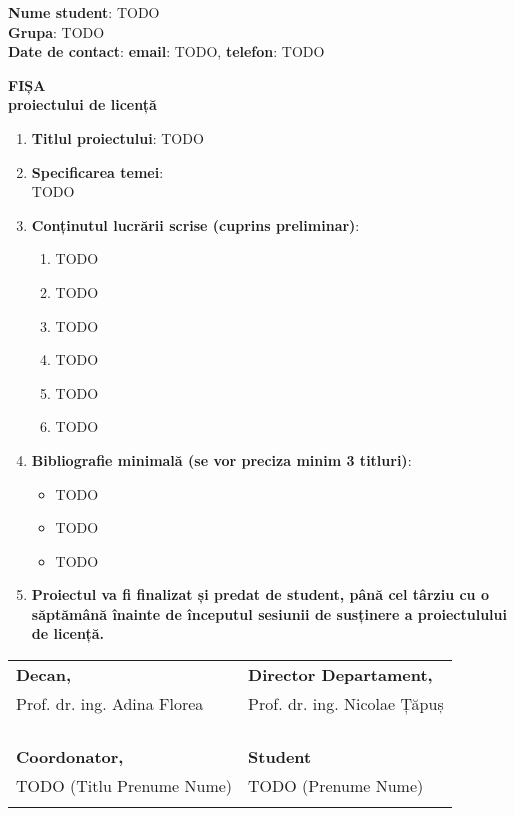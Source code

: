 \documentclass[12pt]{cse-form}
\begin{document}
\textbf{Nume student}: TODO \\
\textbf{Grupa}: TODO \\
\textbf{Date de contact}: \textbf{email}: TODO, \textbf{telefon}: TODO

\vspace{7mm}

\begin{center}
  \large{\textbf{FIȘA\\
  proiectului de licență}}
\end{center}

\vspace{7mm}

\begin{enumerate}
  \item \textbf{Titlul proiectului}: TODO
  \item \textbf{Specificarea temei}:\\
    TODO
  \item \textbf{Conținutul lucrării scrise (cuprins preliminar)}:
    \begin{enumerate}
      \item TODO
      \item TODO
      \item TODO
      \item TODO
      \item TODO
      \item TODO
    \end{enumerate}
  \item \textbf{Bibliografie minimală (se vor preciza minim 3 titluri)}:
    \begin{itemize}
      \item TODO
      \item TODO
      \item TODO
    \end{itemize}
  \item \textbf{Proiectul va fi finalizat și predat de student, până cel
      târziu cu o săptămână înainte de începutul sesiunii de susținere a
    proiectulului de licență.}
\end{enumerate}

\vspace{10mm}

\begin{center}
  \begin{tabular}{@{}p{}p{}@{}}
    \textbf{Decan,} & \textbf{Director Departament,} \\
    Prof. dr. ing. Adina Florea & Prof. dr. ing. Nicolae Țăpuș \\
    & \\
    & \\
    & \\
    & \\
    \textbf{Coordonator,} & \textbf{Student} \\
    TODO (Titlu Prenume Nume) & TODO (Prenume Nume) \\
    & \\
  \end{tabular}
\end{center}
\end{document}
